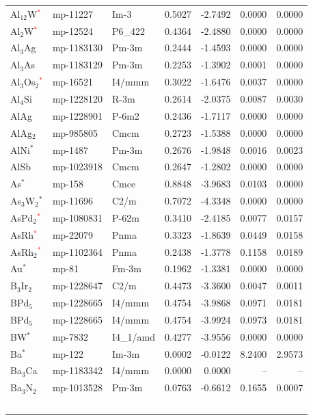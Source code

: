 \begin{longtable}{@{}lllrrrr@{}}
Al$_{12}$W\textcolor{red}{$^*$} & mp-11227 & Im-3 & 0.5027 & -2.7492 & 0.0000 & 0.0000 \\
Al$_{2}$W\textcolor{red}{$^*$} & mp-12524 & P6\_422 & 0.4364 & -2.4880 & 0.0000 & 0.0000 \\
Al$_{3}$Ag & mp-1183130 & Pm-3m & 0.2444 & -1.4593 & 0.0000 & 0.0000 \\
Al$_{3}$As & mp-1183129 & Pm-3m & 0.2253 & -1.3902 & 0.0001 & 0.0000 \\
Al$_{3}$Os$_{2}$\textcolor{red}{$^*$} & mp-16521 & I4/mmm & 0.3022 & -1.6476 & 0.0037 & 0.0000 \\
Al$_{4}$Si & mp-1228120 & R-3m & 0.2614 & -2.0375 & 0.0087 & 0.0030 \\
AlAg & mp-1228901 & P-6m2 & 0.2436 & -1.7117 & 0.0000 & 0.0000 \\
AlAg$_{2}$ & mp-985805 & Cmcm & 0.2723 & -1.5388 & 0.0000 & 0.0000 \\
AlNi$^*$ & mp-1487 & Pm-3m & 0.2676 & -1.9848 & 0.0016 & 0.0023 \\
AlSb & mp-1023918 & Cmcm & 0.2647 & -1.2802 & 0.0000 & 0.0000 \\
As$^*$ & mp-158 & Cmce & 0.8848 & -3.9683 & 0.0103 & 0.0000 \\
As$_{3}$W$_{2}$$^*$ & mp-11696 & C2/m & 0.7072 & -4.3348 & 0.0000 & 0.0000 \\
AsPd$_{2}$\textcolor{red}{$^*$} & mp-1080831 & P-62m & 0.3410 & -2.4185 & 0.0077 & 0.0157 \\
AsRh\textcolor{red}{$^*$} & mp-22079 & Pnma & 0.3323 & -1.8639 & 0.0449 & 0.0158 \\
AsRh$_{2}$\textcolor{red}{$^*$} & mp-1102364 & Pnma & 0.2438 & -1.3778 & 0.1158 & 0.0189 \\
Au$^*$ & mp-81 & Fm-3m & 0.1962 & -1.3381 & 0.0000 & 0.0000 \\
B$_{3}$Ir$_{2}$ & mp-1228647 & C2/m & 0.4473 & -3.3600 & 0.0047 & 0.0011 \\
BPd$_{5}$ & mp-1228665 & I4/mmm & 0.4754 & -3.9868 & 0.0971 & 0.0181 \\
BPd$_{5}$ & mp-1228665 & I4/mmm & 0.4754 & -3.9924 & 0.0973 & 0.0181 \\
BW$^*$ & mp-7832 & I4\_1/amd & 0.4277 & -3.9556 & 0.0000 & 0.0000 \\
Ba$^*$ & mp-122 & Im-3m & 0.0002 & -0.0122 & 8.2400 & 2.9573 \\
Ba$_{3}$Ca & mp-1183342 & I4/mmm & 0.0000 & 0.0000 & -- & -- \\
Ba$_{3}$N$_{2}$ & mp-1013528 & Pm-3m & 0.0763 & -0.6612 & 0.1655 & 0.0007 \\
$$
\end{longtable}
